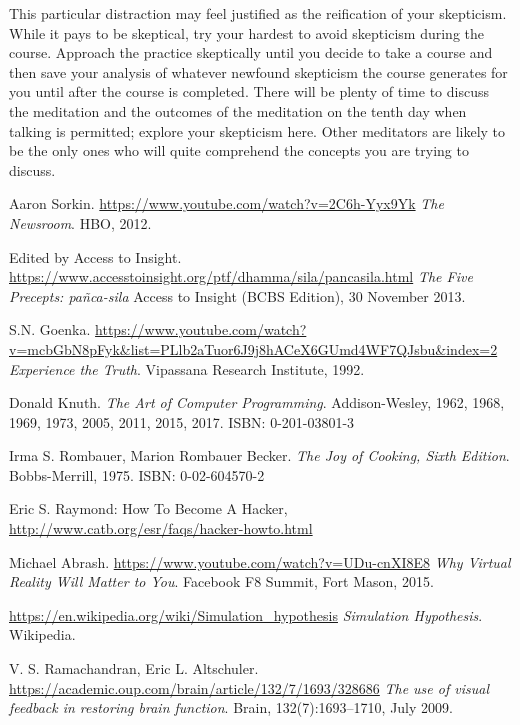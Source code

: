 \documentclass{article}
\begin{document}
This particular distraction may feel justified as the reification of your skepticism. While it pays to be skeptical, try your hardest to avoid skepticism during the course. Approach the practice skeptically until you decide to take a course and then save your analysis of whatever newfound skepticism the course generates for you until after the course is completed. There will be plenty of time to discuss the meditation and the outcomes of the meditation on the tenth day when talking is permitted; explore your skepticism here. Other meditators are likely to be the only ones who will quite comprehend the concepts you are trying to discuss.

\pagebreak

\begin{thebibliography}{9}
\raggedright

  Aaron Sorkin.
  \url{https://www.youtube.com/watch?v=2C6h-Yyx9Yk}
  \textit{The Newsroom}.
  HBO, 2012.

  Edited by Access to Insight.
  \url{https://www.accesstoinsight.org/ptf/dhamma/sila/pancasila.html}
  \textit{The Five Precepts: pañca-sila}
  Access to Insight (BCBS Edition), 30 November 2013.

  S.N. Goenka.
  \url{https://www.youtube.com/watch?v=mcbGbN8pFyk&list=PLlb2aTuor6J9j8hACeX6GUmd4WF7QJsbu&index=2}
  \textit{Experience the Truth}.
  Vipassana Research Institute, 1992.

  Donald Knuth.
  \textit{The Art of Computer Programming}.
  Addison-Wesley, 1962, 1968, 1969, 1973, 2005, 2011, 2015, 2017.
  ISBN: 0-201-03801-3

  Irma S. Rombauer, Marion Rombauer Becker.
  \textit{The Joy of Cooking, Sixth Edition}.
  Bobbs-Merrill, 1975.
  ISBN: 0-02-604570-2

  Eric S. Raymond: How To Become A Hacker,
  \url{http://www.catb.org/esr/faqs/hacker-howto.html}

  Michael Abrash.
  \url{https://www.youtube.com/watch?v=UDu-cnXI8E8}
  \textit{Why Virtual Reality Will Matter to You}.
  Facebook F8 Summit, Fort Mason, 2015.

  \url{https://en.wikipedia.org/wiki/Simulation_hypothesis}
  \textit{Simulation Hypothesis}.
  Wikipedia.

  V. S. Ramachandran, Eric L. Altschuler.
  \url{https://academic.oup.com/brain/article/132/7/1693/328686}
  \textit{The use of visual feedback in restoring brain function}.
  Brain, 132(7):1693–1710, July 2009.


\end{thebibliography}
\end{document}
